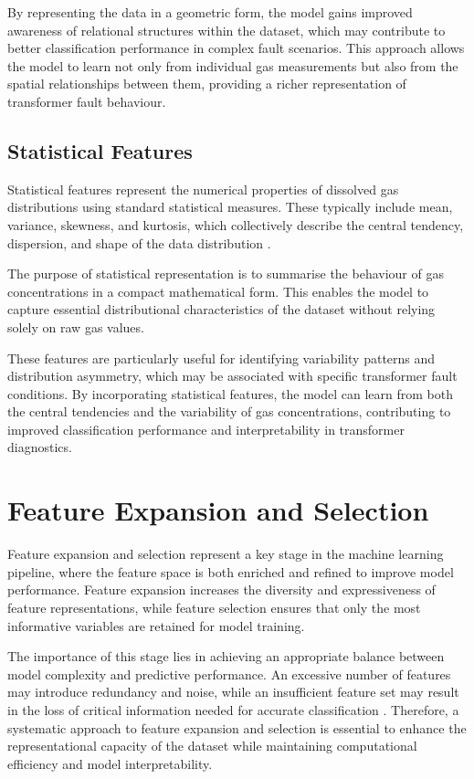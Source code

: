 By representing the data in a geometric form, the model gains improved awareness of relational structures within the dataset, which may contribute to better classification performance in complex fault scenarios. This approach allows the model to learn not only from individual gas measurements but also from the spatial relationships between them, providing a richer representation of transformer fault behaviour.

\subsection{Statistical Features}

Statistical features represent the numerical properties of dissolved gas distributions using standard statistical measures. These typically include mean, variance, skewness, and kurtosis, which collectively describe the central tendency, dispersion, and shape of the data distribution \parencite{Hu2025InterpretableEdge}.

The purpose of statistical representation is to summarise the behaviour of gas concentrations in a compact mathematical form. This enables the model to capture essential distributional characteristics of the dataset without relying solely on raw gas values.

These features are particularly useful for identifying variability patterns and distribution asymmetry, which may be associated with specific transformer fault conditions. By incorporating statistical features, the model can learn from both the central tendencies and the variability of gas concentrations, contributing to improved classification performance and interpretability in transformer diagnostics.

\section{Feature Expansion and Selection}

Feature expansion and selection represent a key stage in the machine learning pipeline, where the feature space is both enriched and refined to improve model performance. Feature expansion increases the diversity and expressiveness of feature representations, while feature selection ensures that only the most informative variables are retained for model training.

The importance of this stage lies in achieving an appropriate balance between model complexity and predictive performance. An excessive number of features may introduce redundancy and noise, while an insufficient feature set may result in the loss of critical information needed for accurate classification \parencite{Laburu2024Insights}. Therefore, a systematic approach to feature expansion and selection is essential to enhance the representational capacity of the dataset while maintaining computational efficiency and model interpretability.

